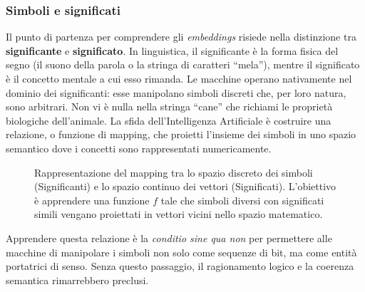 \subsubsection{Simboli e significati}
\label{subsubsec:symbols_meanings}
Il punto di partenza per comprendere gli \textit{embeddings} risiede nella distinzione tra \textbf{significante} e \textbf{significato}. In linguistica, il significante è la forma fisica del segno (il suono della parola o la stringa di caratteri ``mela''), mentre il significato è il concetto mentale a cui esso rimanda. Le macchine operano nativamente nel dominio dei significanti: esse manipolano simboli discreti che, per loro natura, sono arbitrari. Non vi è nulla nella stringa ``cane'' che richiami le proprietà biologiche dell'animale. 
La sfida dell'Intelligenza Artificiale è costruire una relazione, o funzione di mapping, che proietti l'insieme dei simboli in uno spazio semantico dove i concetti sono rappresentati numericamente.
\begin{figure}[htbp]
\centering
{}
\caption{Rappresentazione del mapping tra lo spazio discreto dei simboli (Significanti) e lo spazio continuo dei vettori (Significati). L'obiettivo è apprendere una funzione $f$ tale che simboli diversi con significati simili vengano proiettati in vettori vicini nello spazio matematico.}
\label{fig:signifier_signified_mapping}
\end{figure}
Apprendere questa relazione è la \textit{conditio sine qua non} per permettere alle macchine di manipolare i simboli non solo come sequenze di bit, ma come entità portatrici di senso. Senza questo passaggio, il ragionamento logico e la coerenza semantica rimarrebbero preclusi.
